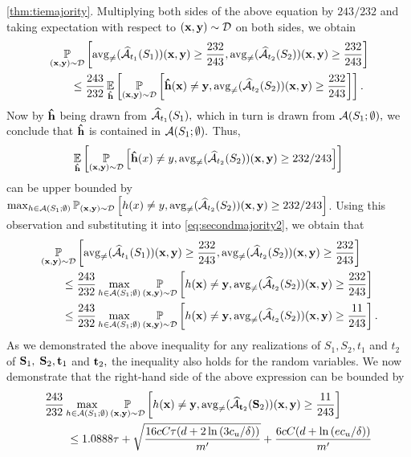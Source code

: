 \begin{proofof}{\cref{thm:tiemajority}.}
Multiplying both sides of the above equation by $ 243/232 $ and taking expectation with respect to $ (\mathbf{x},\mathbf{y})\sim\mathcal{D} $ on both sides, we obtain
\begin{align}\label{eq:secondmajority2}
& \operatorname*{\mathbb{P}}_{(\mathbf{x},\mathbf{y})\sim\mathcal{D}}\left[\operatorname{\mathrm{avg}_{\not=}}(\widehat{\mathcal{A}}_{t_{1}}(S_{1}))(\mathbf{x},\mathbf{y})\geq \frac{232}{243},\operatorname{\mathrm{avg}_{\not=}}(\widehat{\mathcal{A}}_{t_{2}}(S_{2}))(\mathbf{x},\mathbf{y})\geq \frac{232}{243}\right]   \\ 
& \qquad \leq \frac{243}{232}\operatorname*{\mathbb{E}}_{\mathbf{\hat{h}}}\left[\operatorname*{\mathbb{P}}_{(\mathbf{x},\mathbf{y})\sim \mathcal{D}}\left[\mathbf{\hat{h}}(\mathbf{x})\not=\mathbf{y},\operatorname{\mathrm{avg}_{\not=}}(\widehat{\mathcal{A}}_{t_{2}}(S_{2}))(\mathbf{x},\mathbf{y})\geq \frac{232}{243}\right]\right].
\end{align}
Now by $ \mathbf{\hat{h}} $ being drawn from $ \widehat{\mathcal{A}}_{t_1}(S_{1}),$ which in turn is drawn from $ \mathcal{A}(S_{1};\emptyset),$ we conclude that $ \mathbf{\hat{h}} $ is contained in $ \mathcal{A}(S_{1};\emptyset).$ Thus, 
\[ \operatorname*{\mathbb{E}}_{\mathbf{\hat{h}}}\left[\operatorname*{\mathbb{P}}_{(\mathbf{x},\mathbf{y})\sim \mathcal{D}}\left[\mathbf{\hat{h}}(x)\not=y,\operatorname{\mathrm{avg}_{\not=}}(\widehat{\mathcal{A}}_{t_{2}}(S_{2}))(\mathbf{x},\mathbf{y})\geq 232/243 \right]\right] \] 
can be upper bounded by $ \max_{h\in \mathcal{A}(S_{1};\emptyset)}\operatorname*{\mathbb{P}}_{(\mathbf{x},\mathbf{y})\sim \mathcal{D}}\left[h(x)\not=y,\operatorname{\mathrm{avg}_{\not=}}(\widehat{\mathcal{A}}_{t_{2}}(S_{2}))(\mathbf{x},\mathbf{y})\geq 232/243\right]$. 
Using this observation and substituting it into \cref{eq:secondmajority2}, we obtain that
\begin{align*}
& \operatorname*{\mathbb{P}}_{(\mathbf{x},\mathbf{y})\sim\mathcal{D}}\left[\operatorname{\mathrm{avg}_{\not=}}(\widehat{\mathcal{A}}_{t_{1}}(S_{1}))(\mathbf{x},\mathbf{y})\geq \frac{232}{243},\operatorname{\mathrm{avg}_{\not=}}(\widehat{\mathcal{A}}_{t_{2}}(S_{2}))(\mathbf{x},\mathbf{y})\geq \frac{232}{243}\right] \\
& \qquad \leq\frac{243}{232}\max_{h\in \mathcal{A}(S_{1};\emptyset)}\operatorname*{\mathbb{P}}_{(\mathbf{x},\mathbf{y})\sim \mathcal{D}}\left[h(\mathbf{x})\not=\mathbf{y},\operatorname{\mathrm{avg}_{\not=}}(\widehat{\mathcal{A}}_{t_{2}}(S_{2}))(\mathbf{x},\mathbf{y})\geq \frac{232}{243}\right] \\
& \qquad \leq\frac{243}{232}\max_{h\in \mathcal{A}(S_{1};\emptyset)}\operatorname*{\mathbb{P}}_{(\mathbf{x},\mathbf{y})\sim \mathcal{D}}\left[h(\mathbf{x})\not=\mathbf{y},\operatorname{\mathrm{avg}_{\not=}}(\widehat{\mathcal{A}}_{t_{2}}(S_{2}))(\mathbf{x},\mathbf{y})\geq \frac{11}{243}\right].
\end{align*}
As we demonstrated the above inequality for any realizations of $ S_{1},S_{2},t_{1}$ and $ t_{2} $ of $ \mathbf{S}_{1},$ $ \mathbf{S}_{2}, \mathbf{t}_{1}$ and $ \mathbf{t}_{2},$ the inequality also holds for the random variables. 
We now demonstrate that the right-hand side of the above expression can be bounded by
\begin{align}\label{eq:secondmajority0}
& \frac{243}{232}\max_{h\in \cA(S_{1};\emptyset)}\p_{(\rx,\ry)\sim \cD}\left[h(\rx)\not=\ry,\avg(\widehat{\cA}_{\rt_{2}}(\rS_{2}))(\rx,\ry)\geq \frac{11}{243}\right] \nonumber \\ 
& \qquad  \leq 1.0888\tau+\sqrt{\frac{16cC\tau(d+2\ln{\left(3\cu/\delta \right)})}{m'}}+\frac{6cC(d+\ln{\left(e\cu /\delta \right)})}{m'}

\end{align}
\end{proofof}
